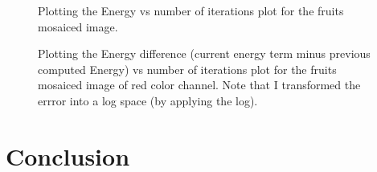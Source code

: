\documentclass{paper}
\begin{document}
\begin{figure}[H]
\begin{center}
\end{center}
\caption{Plotting the Energy vs number of iterations plot for the fruits mosaiced image.}
\label{fig:energy_vs_iterations}
\end{figure}

\begin{figure}[H]
\begin{center}
\end{center}
\caption{Plotting the Energy difference (current energy term minus previous computed Energy) vs number of iterations plot for the fruits mosaiced image of red color channel. Note that I transformed the errror into a log space (by applying the log).}
\label{fig:log_diff_energy_vs_iterations}
\end{figure}

\section{Conclusion}
\end{document}
